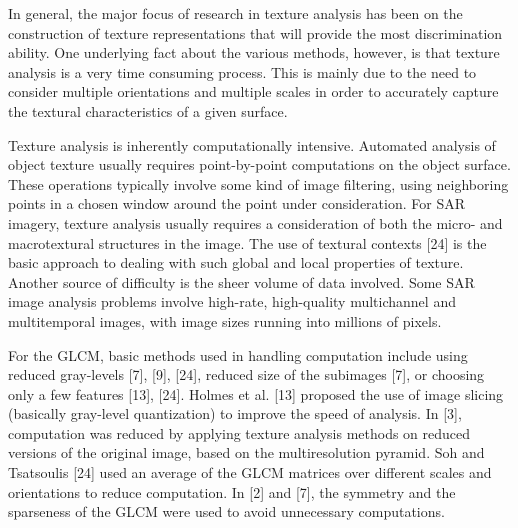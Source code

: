 \documentclass[paper=a4, fontsize=11pt]{scrartcl}
\begin{document}
In general, the major focus of research in texture analysis has been on the construction of texture representations that will provide the most discrimination ability.
One underlying fact about the various methods, however, is that texture analysis is a very time consuming process. 
This is mainly due to the need to consider multiple orientations and multiple scales in order to accurately capture the textural characteristics of a given surface.

Texture analysis is inherently computationally intensive. 
Automated analysis of object texture usually requires point-by-point computations on the object surface. 
These operations typically involve some kind of image filtering, using neighboring points in a chosen window around the point under consideration.
For SAR imagery, texture analysis usually requires a consideration of both the micro- and macrotextural structures in the image. 
The use of textural contexts [24] is the basic approach to dealing with such global and local properties of texture. 
Another source of difficulty is the sheer volume of data involved. Some SAR image analysis problems involve high-rate, high-quality multichannel and multitemporal images, with image sizes running into millions of pixels.

For the GLCM, basic methods used in handling computation include using reduced gray-levels [7], [9], [24], reduced size of the subimages [7], or choosing only a few features [13], [24]. 
Holmes et al. [13] proposed the use of image slicing (basically gray-level quantization) to improve the speed of analysis. 
In [3], computation was reduced by applying texture analysis methods on reduced versions of the original image, based on the multiresolution pyramid. 
Soh and Tsatsoulis [24] used an average of the GLCM matrices over different scales and orientations to reduce computation. 
In [2] and [7], the symmetry and the sparseness of the GLCM were used to avoid unnecessary computations.
\end{document}
